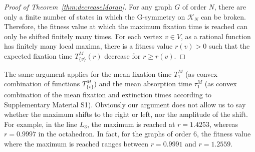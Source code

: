 \documentclass[a4paper,english,10pt]{amsart}
\newcommand{\calk}{\mathcal{K}}
\theoremstyle{definition}
\numberwithin{equation}{section}
\begin{document}
\begin{proof}[Proof of Theorem~\ref{thm:decreaseMoran}] For any graph $G$ of order $N$, there are only a finite number of states in which the G-symmetry on $\calk_N$ can be broken. Therefore, the fitness value at which the maximum fixation time is reached can only be shifted finitely many times. 
For each vertex $v \in V$, as a rational function has finitely many local maxima, there is a fitness value $r(v) > 0$ such that the expected fixation time
$T^M_{\{v\}}(r)$ decrease for $r \geq r(v)$.
\end{proof}

The same argument applies for the mean fixation time $T_1^M$ (as convex combination of functions $T^M_{\{v\}}$) and the mean absorption time $\tau_1^M$ (as convex combination of the mean fixation and extinction times according to Supplementary Material S1). Obviously our argument does not allow us to say whether the maximum shifts to the right or left, nor the amplitude of the shift. For example, in the line $L_3$, the maximum is reached at $r = 1.4253$, whereas $r = 0.9997$ in the octahedron. In fact, for the graphs of order $6$, the fitness value where the maximum is reached ranges between $r=0.9991$ and $r =1.2559$. 
\end{document}
